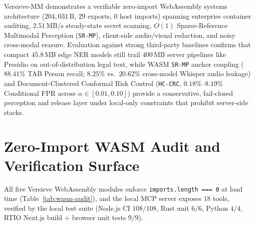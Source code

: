 \documentclass{article}
\begin{document}
Versieve-MM demonstrates a verifiable zero-import WebAssembly systems architecture ($204{,}031$\,B, $29$ exports, $0$ host imports) spanning enterprise container auditing, $2.51$\,MB/s steady-state secret scanning, $O(1)$ Sparse-Reference Multimodal Perception (\texttt{SR-MP}), client-side audio/visual redaction, and noisy cross-modal erasure. Evaluation against strong third-party baselines confirms that compact $45.8$\,MB edge NER models still trail $400$\,MB server pipelines like Presidio on out-of-distribution legal text, while WASM \texttt{SR-MP} anchor coupling ($88.41\%$ TAB Person recall; $8.25\%$ vs.\ $20.62\%$ cross-model Whisper audio leakage) and Document-Clustered Conformal Risk Control (\texttt{HC-CRC}, $0.18\%$--$8.19\%$ Conditional FPR across $\alpha \in [0.01, 0.10]$) provide a conservative, fail-closed perception and release layer under local-only constraints that prohibit server-side stacks.




\appendix
\section{Zero-Import WASM Audit and Verification Surface}
\label{app:audit}

All five Versieve WebAssembly modules enforce \texttt{imports.length === 0} at load time (Table~\ref{tab:wasm-audit}), and the local MCP server exposes $18$ tools, verified by the local test suite (Node.js CI $108/108$, Rust unit $6/6$, Python $4/4$, RTIO Next.js build + browser unit tests $9/9$).

\begin{table}[h]
\caption{Load-time zero-import audit across all five Versieve WebAssembly modules.}
\label{tab:wasm-audit}
\vskip 0.08in
\begin{center}
\end{center}
\vskip -0.10in
\end{table}
\end{document}
